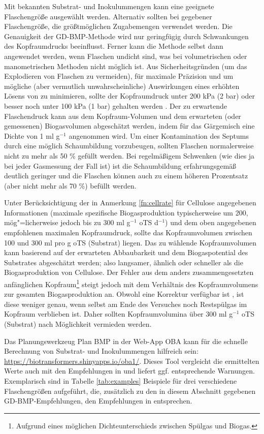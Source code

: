 \documentclass[]{article}
\begin{document}
Mit bekannten Substrat- und Inokulummengen kann eine geeignete Flaschengröße ausgewählt werden.
Alternativ sollten bei gegebener Flaschengröße, die größtmöglichen Zugabemengen verwendet werden.
Die Genauigkeit der GD-BMP-Methode wird nur geringfügig durch Schwankungen des Kopfraumdrucks beeinflusst. Ferner kann die Methode selbst dann angewendet werden, wenn Flaschen undicht sind, was bei volumetrischen oder manometrischen Methoden nicht möglich ist.
Aus Sicherheitsgründen (um das Explodieren von Flaschen zu vermeiden), für maximale Präzision und um mögliche (aber vermutlich unwahrscheinliche) Auswirkungen eines erhöhten Lösens von  zu minimieren, sollte der Kopfraumdruck unter 200 kPa (2 bar) oder besser noch unter 100 kPa (1 bar) gehalten werden \citep{hafnerSystematicErrorManometric2019}.
Der zu erwartende Flaschendruck kann aus dem Kopfraum-Volumen und dem erwarteten (oder gemessenen) Biogasvolumen abgeschätzt werden, indem für das Gärgemisch eine Dichte von 1 ml g$^{-1}$ angenommen wird.
Um einer Kontamination des Septums durch eine möglich Schaumbildung vorzubeugen, sollten Flaschen normalerweise nicht zu mehr als 50 \% gefüllt werden. Bei regelmäßigem Schwenken (wie dies ja bei jeder Gasmessung der Fall ist) ist die Schaumbildung erfahrungsgemäß deutlich geringer und die Flaschen können auch zu einem höheren Prozentsatz (aber nicht mehr als 70 \%) befüllt werden.

Unter Berücksichtigung der in Anmerkung \ref{fn:cellrate} für Cellulose angegebenen Informationen (maximale spezifische Biogasproduktion typischerweise um 200, mög"=licherweise jedoch bis zu 300 ml g$^{-1}$ oTS d$^{-1}$) und dem oben angegebenen empfohlenen maximalen Kopfraumdruck, sollte das Kopfraumvolumen zwischen 100 und 300 ml pro g oTS (Substrat) liegen.
Das zu wählende Kopfraumvolumen kann basierend auf der erwarteten Abbaubarkeit und dem Biogaspotential des Substrates abgeschätzt werden; also langsamer, ähnlich oder schneller als die Biogasproduktion von Cellulose.
Der Fehler aus dem anders zusammengesetzten anfänglichen Kopfraum\footnote{Aufgrund eines möglichen Dichteunterschieds zwischen Spülgas und Biogas.} steigt jedoch mit dem Verhältnis des Kopfraumvolumens zur gesamten Biogasproduktion an. Obwohl eine Korrektur verfügbar ist \citep{justesenDevelopmentValidationLowcost2019}, ist diese weniger genau, wenn selbst am Ende des Versuches noch Restspülgas im Kopfraum verblieben ist.
Daher sollten Kopfraumvolumina über 300 ml g$^{-1}$ oTS (Substrat) nach Möglichkeit vermieden werden.

Das Planungswerkzeug \glqq Plan BMP\grqq{} in der Web-App OBA kann für die schnelle Berechnung von Substrat- und Inokulummengen hilfreich sein: \url{https://biotransformers.shinyapps.io/oba1/}.
Dieses Tool vergleicht die ermittelten Werte auch mit den Empfehlungen in \citet{holligerStandardizationBiomethanePotential2016} und liefert ggf. entsprechende Warnungen.
Exemplarisch sind in Tabelle \ref{tab:examples} Beispiele für drei verschiedene Flaschengrößen aufgeführt, die, zusätzlich zu den in diesem Abschnitt gegebenen GD-BMP-Empfehlungen, den Empfehlungen in \citet{holligerStandardizationBiomethanePotential2016} entsprechen.
\end{document}

